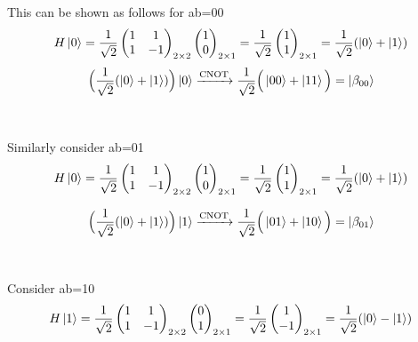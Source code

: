 \documentclass[a4paper,12pt]{article}
\begin{document}
\begin{enumerate}[label=(\alph*)]
This can be shown as follows for ab=00
\[H\ket{0} = \frac{1}{\sqrt{2}}\begin{pmatrix}1 & 1  \\
        1 & -1\end{pmatrix}_{2 \times 2} \begin{pmatrix}1 \\
        0\end{pmatrix}_{2 \times 1} = \frac{1}{\sqrt{2}}\begin{pmatrix}1 \\
        1\end{pmatrix}_{2 \times 1} = \frac{1}{\sqrt{2}}( {\ket{0} + \ket{1}})\]
        \[\Big(\frac{1}{\sqrt{2}}(\ket{0}+\ket{1})\Big)\ket{0}\xrightarrow{\text{CNOT}}\frac{1}{\sqrt{2}}\Big(\ket{00}+ \ket{11}\Big) = \ket{\beta_{00}}\] \\~\\
Similarly consider ab=01
\[H\ket{0} = \frac{1}{\sqrt{2}}\begin{pmatrix}1 & 1  \\
    1 & -1\end{pmatrix}_{2 \times 2} \begin{pmatrix}1 \\
    0\end{pmatrix}_{2 \times 1} = \frac{1}{\sqrt{2}}\begin{pmatrix}1 \\
    1\end{pmatrix}_{2 \times 1} = \frac{1}{\sqrt{2}}( {\ket{0} + \ket{1}})\]



\[\Big(\frac{1}{\sqrt{2}}(\ket{0}+\ket{1})\Big)\ket{1}\xrightarrow{\text{CNOT}}\frac{1}{\sqrt{2}}\Big(\ket{01}+ \ket{10}\Big) = \ket{\beta_{01}}\] \\~\\

Consider ab=10
\[H\ket{1} = \frac{1}{\sqrt{2}}\begin{pmatrix}1 & 1  \\
    1 & -1\end{pmatrix}_{2 \times 2} \begin{pmatrix}0 \\
    1\end{pmatrix}_{2 \times 1} = \frac{1}{\sqrt{2}}\begin{pmatrix}1 \\
    -1\end{pmatrix}_{2 \times 1} = \frac{1}{\sqrt{2}}( {\ket{0} - \ket{1}})\]




\end{enumerate}
\end{document}
